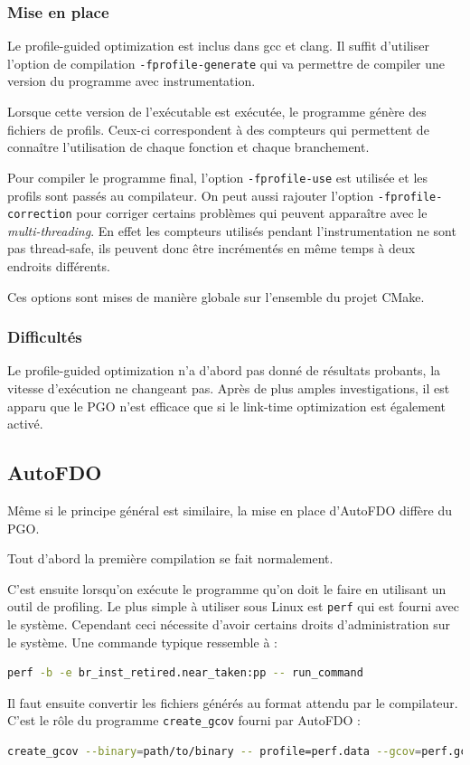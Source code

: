 \documentclass[a4paper,11pt]{report}
\begin{document}
\subsubsection{Mise en place}
Le profile-guided optimization est inclus dans gcc et clang.
Il suffit d'utiliser l'option de compilation \verb'-fprofile-generate' qui va permettre de compiler une version du programme avec instrumentation.

Lorsque cette version de l'exécutable est exécutée, le programme génère des fichiers de profils.
Ceux-ci correspondent à des compteurs qui permettent de connaître l'utilisation de chaque fonction et chaque branchement.

Pour compiler le programme final, l'option \verb'-fprofile-use' est utilisée et les profils sont passés au compilateur.
On peut aussi rajouter l'option \verb'-fprofile-correction' pour corriger certains problèmes qui peuvent apparaître avec le \emph{multi-threading}.
En effet les compteurs utilisés pendant l'instrumentation ne sont pas thread-safe, ils peuvent donc être incrémentés en même temps à deux endroits différents.

Ces options sont mises de manière globale sur l'ensemble du projet CMake.

\subsubsection{Difficultés}
Le profile-guided optimization n'a d'abord pas donné de résultats probants, la vitesse d'exécution ne changeant pas.
Après de plus amples investigations, il est apparu que le PGO n'est efficace que si le link-time optimization est également activé.

\subsection{AutoFDO}
Même si le principe général est similaire, la mise en place d'AutoFDO diffère du PGO.

Tout d'abord la première compilation se fait normalement.

C'est ensuite lorsqu'on exécute le programme qu'on doit le faire en utilisant un outil de profiling.
Le plus simple à utiliser sous Linux est \verb'perf' qui est fourni avec le système.
Cependant ceci nécessite d'avoir certains droits d'administration sur le système.
Une commande typique ressemble à :
\begin{lstlisting}[language=bash]
perf -b -e br_inst_retired.near_taken:pp -- run_command
\end{lstlisting}
Il faut ensuite convertir les fichiers générés au format attendu par le compilateur.
C'est le rôle du programme \verb'create_gcov' fourni par AutoFDO :
\begin{lstlisting}[language=bash]
create_gcov --binary=path/to/binary -- profile=perf.data --gcov=perf.gcov -gcov_version=1
\end{lstlisting}
\end{document}
